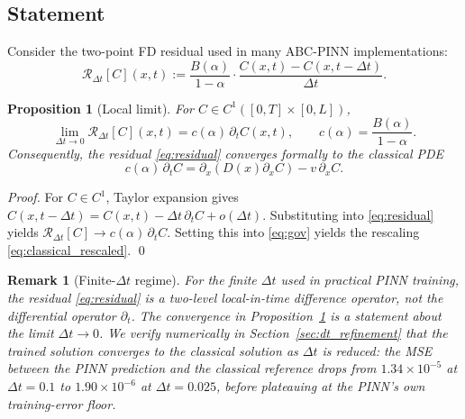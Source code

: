 \documentclass[11pt]{article}
\newtheorem{proposition}{Proposition}
\newtheorem{remark}{Remark}
\begin{document}
\subsection{Statement}

Consider the two-point FD residual used in many ABC-PINN implementations:
\begin{equation}
\mathcal{R}_{\Delta t}[C](x,t) := \frac{B(\alpha)}{1-\alpha}\cdot\frac{C(x,t)-C(x,t-\Delta t)}{\Delta t}.
\label{eq:residual}
\end{equation}

\begin{proposition}[Local limit]
\label{prop:local_limit}
For \(C\in C^1([0,T]\times[0,L])\),
\begin{equation}
\lim_{\Delta t\to 0} \mathcal{R}_{\Delta t}[C](x,t) = c(\alpha)\,\partial_t C(x,t),
\qquad c(\alpha) = \frac{B(\alpha)}{1-\alpha}.
\end{equation}
Consequently, the residual \eqref{eq:residual} converges formally to the classical PDE
\begin{equation}
c(\alpha)\,\partial_t C = \partial_x\!\left(D(x)\partial_x C\right) - v\,\partial_x C.
\label{eq:classical_rescaled}
\end{equation}
\end{proposition}

\begin{proof}
For \(C\in C^1\), Taylor expansion gives \(C(x,t-\Delta t) = C(x,t) - \Delta t\,\partial_t C + o(\Delta t)\). Substituting into \eqref{eq:residual} yields \(\mathcal{R}_{\Delta t}[C] \to c(\alpha)\,\partial_t C\). Setting this into \eqref{eq:gov} yields the rescaling \eqref{eq:classical_rescaled}. \qed
\end{proof}

\begin{remark}[Finite-\(\Delta t\) regime]
\label{rem:finite_dt}
For the finite \(\Delta t\) used in practical PINN training, the residual \eqref{eq:residual} is a two-level local-in-time difference operator, not the differential operator \(\partial_t\). The convergence in Proposition~\ref{prop:local_limit} is a statement about the \emph{limit} \(\Delta t\to 0\). We verify numerically in Section~\ref{sec:dt_refinement} that the trained solution converges to the classical solution as \(\Delta t\) is reduced: the MSE between the PINN prediction and the classical reference drops from \(1.34\times 10^{-5}\) at \(\Delta t=0.1\) to \(1.90\times 10^{-6}\) at \(\Delta t=0.025\), before plateauing at the PINN's own training-error floor.
\end{remark}
\end{document}
